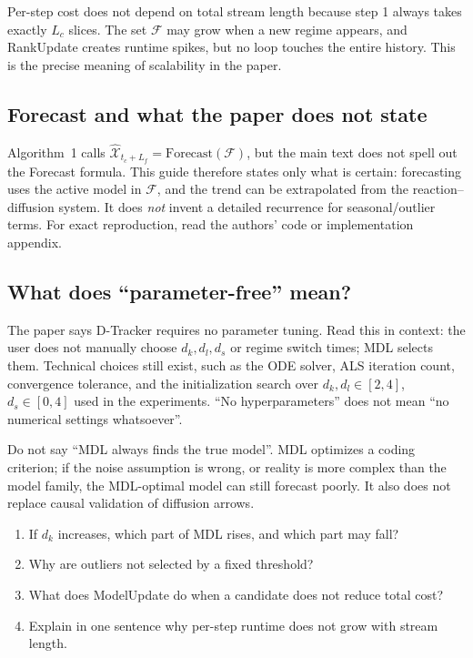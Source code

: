 \begin{keypoint}
Per-step cost does not depend on total stream length because step 1 always takes exactly $L_c$ slices.
The set $\mathcal{F}$ may grow when a new regime appears, and RankUpdate creates runtime spikes, but no
loop touches the entire history. This is the precise meaning of scalability in the paper.
\end{keypoint}

\subsection{Forecast and what the paper does not state}

Algorithm~1 calls
$\widehat{\mathcal{X}}_{t_c+L_f}=\mathrm{Forecast}(\mathcal{F})$, but the main text does not spell out
the Forecast formula. This guide therefore states only what is certain: forecasting uses the active
model in $\mathcal{F}$, and the trend can be extrapolated from the reaction--diffusion system. It does
\emph{not} invent a detailed recurrence for seasonal/outlier terms. For exact reproduction, read the
authors' code or implementation appendix.

\subsection{What does ``parameter-free'' mean?}

The paper says D-Tracker requires no parameter tuning. Read this in context: the user does not manually
choose $d_k,d_l,d_s$ or regime switch times; MDL selects them. Technical choices still exist, such as
the ODE solver, ALS iteration count, convergence tolerance, and the initialization search over
$d_k,d_l\in[2,4]$, $d_s\in[0,4]$ used in the experiments. ``No hyperparameters'' does not mean ``no
numerical settings whatsoever''.

\begin{commonmistake}
Do not say ``MDL always finds the true model''. MDL optimizes a coding criterion; if the noise
assumption is wrong, or reality is more complex than the model family, the MDL-optimal model can still
forecast poorly. It also does not replace causal validation of diffusion arrows.
\end{commonmistake}

\begin{selfcheck}
\begin{enumerate}
  \item If $d_k$ increases, which part of MDL rises, and which part may fall?
  \item Why are outliers not selected by a fixed threshold?
  \item What does ModelUpdate do when a candidate does not reduce total cost?
  \item Explain in one sentence why per-step runtime does not grow with stream length.
\end{enumerate}
\end{selfcheck}

